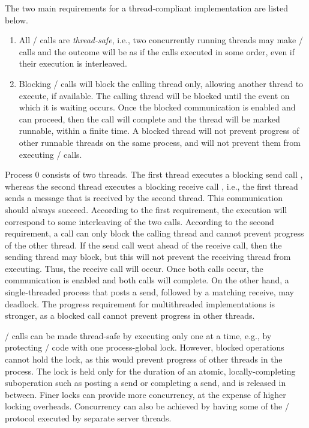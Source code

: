 The two main requirements for a thread-compliant implementation are listed
below.
\begin{enumerate}
\item
All \MPI/ calls are {\em thread-safe},  
i.e., 
two concurrently
running threads may make \MPI/ calls and the outcome will be as if the
calls executed in some order, even if their execution is interleaved.
\item
Blocking \MPI/ calls will block the calling thread only, allowing
another thread to execute, if available.
The calling thread will be blocked until the
event on which it is waiting occurs.  Once the blocked communication is
enabled and can proceed, then the call will complete and the thread
will be marked runnable, within a finite time.
A blocked thread will not prevent progress of other runnable threads
on the same process, and will not prevent them from executing \MPI/
calls.
\end{enumerate}

\begin{example}{\rm
{}
Process 0 consists of two threads.  The first thread
executes a blocking send call , whereas the second thread executes a blocking receive
call ,
i.e., 
the first thread sends a message that is
received by the second thread.  This communication should always
succeed.  According to the first requirement, the execution will
correspond to some interleaving of the two calls.  According to the
second requirement, a call can only block the calling thread and
cannot prevent progress of the other thread.  If the send call went
ahead of the receive call, then the sending thread may block, but this
will not prevent the receiving thread from executing.  Thus, the
receive call
will occur.  Once both calls occur, the communication is enabled
and both calls will complete.  On the other hand, a
single-threaded process that posts a send, followed by a matching
receive, may deadlock.  The progress requirement for multithreaded
implementations is stronger, as a blocked call cannot prevent progress
in other threads.
}
\end{example}

\begin{implementors}
\MPI/ calls can be made thread-safe by executing only one at a time,
e.g., by protecting \MPI/ code with one process-global lock.  However,
blocked
operations cannot hold the lock, as this would prevent progress of
other threads in the process.  The
lock is held only for the duration of an atomic, locally-completing
suboperation such as posting a send or completing a send, and is released
in between.
Finer locks can provide more concurrency, at the expense of higher
locking overheads.
Concurrency can also be achieved by having some of the \MPI/ protocol
executed by separate server threads.
\end{implementors}
